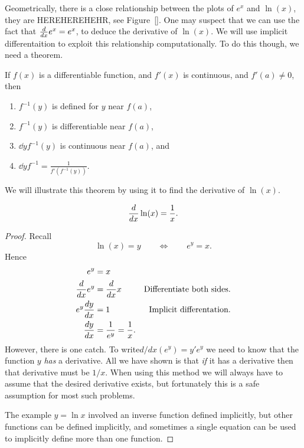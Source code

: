 Geometrically, there is a close relationship between the plots of
$e^x$ and $\ln(x)$, they are HEREHEREHEHR, see Figure~\ref{}. One may
suspect that we can use the fact that $\frac{d}{dx} e^x = e^x$, to deduce the
derivative of $\ln(x)$.  We will use implicit differentaition to
exploit this relationship computationally. To do this though, we need
a theorem.

\begin{mainTheorem}
If $f(x)$ is a differentiable function, and $f'(x)$ is continuous, and
$f'(a) \neq 0$, then 
\begin{enumerate}
\item $f^{-1}(y)$ is defined for $y$ near $f(a)$,
\item $f^{-1}(y)$ is differentiable near $f(a)$, 
\item $\dd{y} f^{-1}(y)$ is continuous near $f(a)$, and
\item $\dd{y}f^{-1}  = \displaystyle\frac{1}{f'(f^{-1}(y))}$.
\end{enumerate}
\end{mainTheorem}

We will illustrate this theorem by using it to find the derivative of
$\ln(x)$. 

\begin{mainTheorem}
\[
\frac{d}{dx} \ln(x) = \frac{1}{x}.
\]
\end{mainTheorem}

\begin{proof}
Recall
\[
\ln(x) = y \qquad\Leftrightarrow\qquad e^y = x.
\]
Hence
\begin{align}
e^y &= x\\
\frac{d}{dx} e^y &= \frac{d}{dx} x &\text{Differentiate both sides.}\\
e^y \frac{dy}{dx} &= 1 &\text{Implicit differentation.}\\
\frac{dy}{dx} &= \frac{1}{e^y} = \frac{1}{x}.
\end{align}
However, there is one catch. To write$d/dx(e^y)=y'e^y$ we need to know that the function $y$ {\it has\/} a
derivative. All we have shown is that {\it if\/} it has a derivative
then that derivative must be $1/x$. When using this method we will
always have to assume that the desired derivative exists, but
fortunately this is a safe assumption for most such problems. 

The example $y=\ln x$ involved an inverse function defined implicitly,
but other functions can be defined implicitly, and sometimes a single
equation can be used to implicitly define more than one
function. 
\end{proof}

